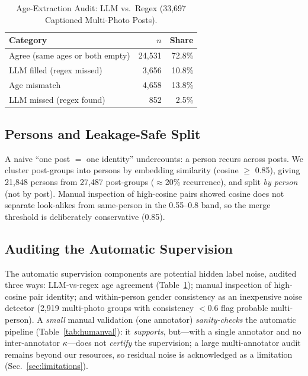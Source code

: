 \documentclass[journal]{IEEEtran}
\begin{document}
\begin{table}[!t]
\renewcommand{\arraystretch}{1.2}
\caption{Age-Extraction Audit: LLM vs.\ Regex (33{,}697 Captioned Multi-Photo Posts).}
\label{tab:age}
\centering
\footnotesize
\begin{tabular}{@{}lrr@{}}
\toprule
Category & $n$ & Share \\
\midrule
Agree (same ages or both empty) & 24{,}531 & 72.8\% \\
LLM filled (regex missed) & 3{,}656 & 10.8\% \\
Age mismatch & 4{,}658 & 13.8\% \\
LLM missed (regex found) & 852 & 2.5\% \\
\bottomrule
\end{tabular}
\end{table}

\subsection{Persons and Leakage-Safe Split}\label{sec:data-persons}
A naive ``one post $=$ one identity'' undercounts: a person recurs across posts. We cluster post-groups into persons by embedding similarity (cosine $\geq$ 0.85), giving 21{,}848 persons from 27{,}487 post-groups ($\approx$20\% recurrence), and split \emph{by person} (not by post). Manual inspection of high-cosine pairs showed cosine does not separate look-alikes from same-person in the 0.55--0.8 band, so the merge threshold is deliberately conservative (0.85).

\subsection{Auditing the Automatic Supervision}\label{sec:data-audit}
The automatic supervision components are potential hidden label noise, audited three ways: LLM-vs-regex age agreement (Table~\ref{tab:age}); manual inspection of high-cosine pair identity; and within-person gender consistency as an inexpensive noise detector (2{,}919 multi-photo groups with consistency $<$0.6 flag probable multi-person). A \emph{small} manual validation (one annotator) \emph{sanity-checks} the automatic pipeline (Table~\ref{tab:humanval}): it \emph{supports}, but---with a single annotator and no inter-annotator $\kappa$---does not \emph{certify} the supervision; a large multi-annotator audit remains beyond our resources, so residual noise is acknowledged as a limitation (Sec.~\ref{sec:limitations}).
\end{document}

